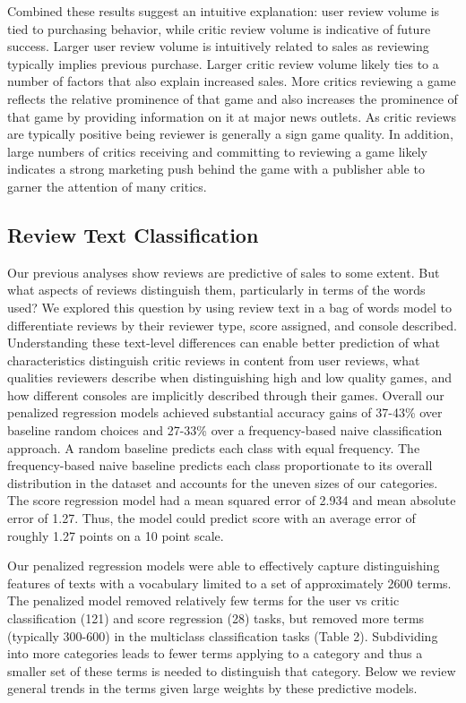\documentclass[letterpaper]{article}
\begin{document}
Combined these results suggest an intuitive explanation: user review volume is tied to purchasing behavior, while critic review volume is indicative of future success. Larger user review volume is intuitively related to sales as reviewing typically implies previous purchase. Larger critic review volume likely ties to a number of factors that also explain increased sales. More critics reviewing a game reflects the relative prominence of that game and also increases the prominence of that game by providing information on it at major news outlets. As critic reviews are typically positive being reviewer is generally a sign game quality. In addition, large numbers of critics receiving and committing to reviewing a game likely indicates a strong marketing push behind the game with a publisher able to garner the attention of many critics.

\subsection{Review Text Classification}
Our previous analyses show reviews are predictive of sales to some extent. But what aspects of reviews distinguish them, particularly in terms of the words used? We explored this question by using review text in a bag of words model to differentiate reviews by their reviewer type, score assigned, and console described. Understanding these text-level differences can enable better prediction of what characteristics distinguish critic reviews in content from user reviews, what qualities reviewers describe when distinguishing high and low quality games, and how different consoles are implicitly described through their games. Overall our penalized regression models achieved substantial accuracy gains of 37-43\% over baseline random choices and 27-33\% over a frequency-based naive classification approach. A random baseline predicts each class with equal frequency. The frequency-based naive baseline predicts each class proportionate to its overall distribution in the dataset and accounts for the uneven sizes of our categories. The score regression model had a mean squared error of 2.934 and mean absolute error of 1.27. Thus, the model could predict score with an average error of roughly 1.27 points on a 10 point scale.


Our penalized regression models were able to effectively capture distinguishing features of texts with a vocabulary limited to a set of approximately 2600 terms. The penalized model removed relatively few terms for the user vs critic classification (121) and score regression (28) tasks, but removed more terms (typically 300-600) in the multiclass classification tasks (Table 2). Subdividing into more categories leads to fewer terms applying to a category and thus a smaller set of these terms is needed to distinguish that category. Below we review general trends in the terms given large weights by these predictive models.
\end{document}
